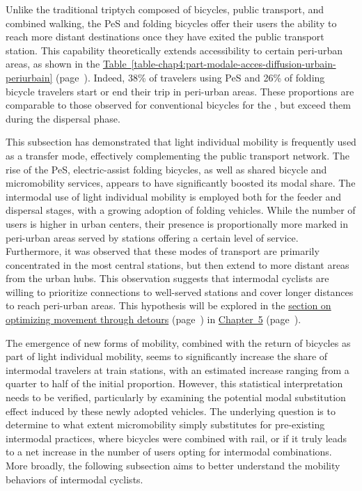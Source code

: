 \begin{refsegment}

Unlike the traditional triptych composed of bicycles, public transport, and combined walking, the \acrshort{PeS} and folding bicycles offer their users the ability to reach more distant destinations once they have exited the public transport station. This capability theoretically extends accessibility to certain peri-urban areas, as shown in the \hyperref[table-chap4:part-modale-acces-diffusion-urbain-periurbain]{Table~\ref{table-chap4:part-modale-acces-diffusion-urbain-periurbain}} (page~\pageref{table-chap4:part-modale-acces-diffusion-urbain-periurbain}). Indeed, 38\% of travelers using \acrshort{PeS} and 26\% of folding bicycle travelers start or end their trip in peri-urban areas. These proportions are comparable to those observed for conventional bicycles for the , but exceed them during the dispersal phase.%

This subsection has demonstrated that light individual mobility is frequently used as a transfer mode, effectively complementing the public transport network. The rise of the \acrshort{PeS}, electric-assist folding bicycles, as well as shared bicycle and micromobility services, appears to have significantly boosted its modal share. The intermodal use of light individual mobility is employed both for the feeder and dispersal stages, with a growing adoption of folding vehicles. While the number of users is higher in urban centers, their presence is proportionally more marked in peri-urban areas served by stations offering a certain level of service. Furthermore, it was observed that these modes of transport are primarily concentrated in the most central stations, but then extend to more distant areas from the urban hubs. This observation suggests that intermodal cyclists are willing to prioritize connections to well-served stations and cover longer distances to reach peri-urban areas. This hypothesis will be explored in the \hyperref[chap5:detours-pauses-optimisation]{section on optimizing movement through detours} (page~\pageref{chap5:detours-pauses-optimisation}) in \hyperref[chap5:titre]{Chapter~5} (page~\pageref{chap5:titre}).%

The emergence of new forms of mobility, combined with the return of bicycles as part of light individual mobility, seems to significantly increase the share of intermodal travelers at train stations, with an estimated increase ranging from a quarter to half of the initial proportion. However, this statistical interpretation needs to be verified, particularly by examining the potential modal substitution effect induced by these newly adopted vehicles. The underlying question is to determine to what extent micromobility simply substitutes for pre-existing intermodal practices, where bicycles were combined with rail, or if it truly leads to a net increase in the number of users opting for intermodal combinations. More broadly, the following subsection aims to better understand the mobility behaviors of intermodal cyclists.%


\end{refsegment}
